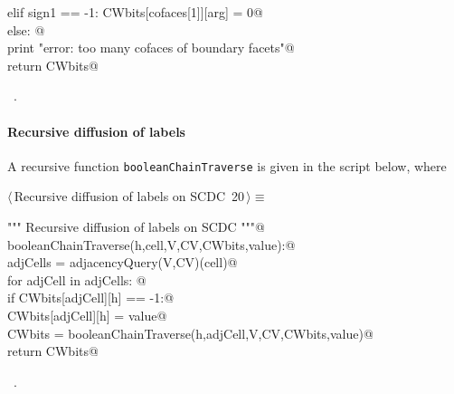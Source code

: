 \documentclass[11pt,oneside]{article}	%
\begin{document}
\begin{flushleft}
\begin{list}{}{}
\mbox{}\verb@            elif sign1 == -1: CWbits[cofaces[1]][arg] = 0@\\
\mbox{}\verb@         else: @\\
\mbox{}\verb@            print "error: too many cofaces of boundary facets"@\\
\mbox{}\verb@   return CWbits@\\
\mbox{}\verb@@{\NWsep}
\end{list}
\vspace{-1ex}
\footnotesize\addtolength{\baselineskip}{-1ex}
\begin{list}{}{\setlength{\itemsep}{-\parsep}\setlength{\itemindent}{-\leftmargin}}
\item \NWtxtMacroRefIn\ .
\end{list}
\end{flushleft}


\paragraph{Recursive diffusion of labels}
A recursive function \texttt{booleanChainTraverse} is given in the script below, where 

\begin{flushleft} \small \label{scrap22}
\protect{}$\langle\,$Recursive diffusion of labels on SCDC\nobreak\ {\footnotesize 20}$\,\rangle\equiv$
\vspace{-1ex}
\begin{list}{}{} \item
\mbox{}\verb@""" Recursive diffusion of labels on SCDC """@\\
\mbox{}\verb@def booleanChainTraverse(h,cell,V,CV,CWbits,value):@\\
\mbox{}\verb@   adjCells = adjacencyQuery(V,CV)(cell)@\\
\mbox{}\verb@   for adjCell in adjCells: @\\
\mbox{}\verb@      if CWbits[adjCell][h] == -1:@\\
\mbox{}\verb@         CWbits[adjCell][h] = value@\\
\mbox{}\verb@         CWbits = booleanChainTraverse(h,adjCell,V,CV,CWbits,value)@\\
\mbox{}\verb@   return CWbits@\\
\mbox{}\verb@@{\NWsep}
\end{list}
\vspace{-1ex}
\footnotesize\addtolength{\baselineskip}{-1ex}
\begin{list}{}{\setlength{\itemsep}{-\parsep}\setlength{\itemindent}{-\leftmargin}}
\item \NWtxtMacroRefIn\ .
\end{list}
\end{flushleft}
\end{document}
